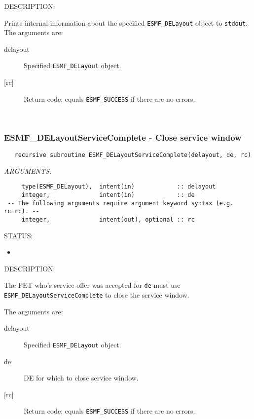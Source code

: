 {\sf DESCRIPTION:\\ }


       Prints internal information about the specified {\tt ESMF\_DELayout} 
       object to {\tt stdout}. \\
  
       The arguments are:
       \begin{description}
       \item[delayout] 
            Specified {\tt ESMF\_DELayout} object.
       \item[{[rc]}] 
            Return code; equals {\tt ESMF\_SUCCESS} if there are no errors.
       \end{description}
   
 
\mbox{}\hrulefill\ 
 
\subsubsection [ESMF\_DELayoutServiceComplete] {ESMF\_DELayoutServiceComplete - Close service window}


 
\begin{verbatim}   recursive subroutine ESMF_DELayoutServiceComplete(delayout, de, rc)\end{verbatim}{\em ARGUMENTS:}
\begin{verbatim}     type(ESMF_DELayout),  intent(in)            :: delayout
     integer,              intent(in)            :: de
 -- The following arguments require argument keyword syntax (e.g. rc=rc). --
     integer,              intent(out), optional :: rc  \end{verbatim}
{\sf STATUS:}
   \begin{itemize}
   \item{}
   \end{itemize}
  
{\sf DESCRIPTION:\\ }


     The PET who's service offer was accepted for {\tt de} must use 
     {\tt ESMF\_DELayoutServiceComplete} to close the service window.
  
       The arguments are:
       \begin{description}
       \item[delayout] 
            Specified {\tt ESMF\_DELayout} object.
       \item[de]
            DE for which to close service window.
       \item[{[rc]}] 
            Return code; equals {\tt ESMF\_SUCCESS} if there are no errors.
       \end{description}
   
